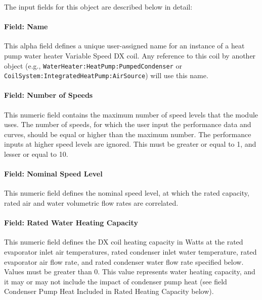 The input fields for this object are described below in detail:


\paragraph{Field: Name}\label{vshpwhheating-name}

This alpha field defines a unique user-assigned name for an instance of a heat pump water heater Variable Speed DX coil.
Any reference to this coil by another object (e.g., \lstinline!WaterHeater:HeatPump:PumpedCondenser! or \lstinline!CoilSystem:IntegratedHeatPump:AirSource!) will use this name.


\paragraph{Field: Number of Speeds}\label{vshpwhheating-number-of-speeds}

This numeric field contains the maximum number of speed levels that the module uses.
The number of speeds, for which the user input the performance data and curves, should be equal or higher than the maximum number.
The performance inputs at higher speed levels are ignored. This must be greater or equal to 1, and lesser or equal to 10.


\paragraph{Field: Nominal Speed Level}\label{vshpwhheating-nominal-speed-level}

This numeric field defines the nominal speed level, at which the rated capacity, rated air and water volumetric flow rates are correlated.


\paragraph{Field: Rated Water Heating Capacity}\label{vshpwhheating-rated-water-heating-capacity}

This numeric field defines the DX coil heating capacity in Watts at the rated evaporator inlet air temperatures, rated condenser inlet water temperature,
rated evaporator air flow rate, and rated condenser water flow rate specified below.
Values must be greater than 0. This value represents water heating capacity, and it may or may not include the impact of condenser pump heat (see field Condenser Pump Heat Included in Rated Heating Capacity below).


